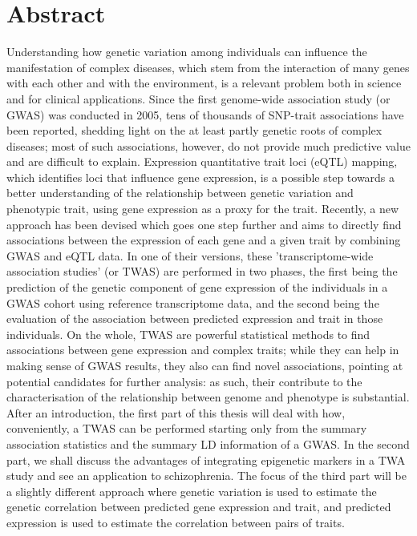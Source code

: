 \documentclass[a4paper,oneside,marginals=justified,nobib]{tufte-book}
\begin{document}

\cleardoublepage
\chapter{Abstract} %

Understanding how genetic variation among individuals can influence the 
manifestation of complex diseases, which stem from the interaction of 
many genes with each other and with the environment, is a relevant 
problem both in science and for clinical applications. Since the first 
genome-wide association study (or GWAS) was conducted in 2005, tens of 
thousands of SNP-trait associations have been reported, shedding light 
on the at least partly genetic roots of complex diseases; most of such 
associations, however, do not provide much predictive value and are 
difficult to explain. Expression quantitative trait loci (eQTL) mapping, 
which identifies loci that influence gene expression, is a possible step 
towards a better understanding of the relationship between genetic 
variation and phenotypic trait, using gene expression as a proxy for the 
trait. Recently, a new approach has been devised which goes one step 
further and aims to directly find associations between the expression of 
each gene and a given trait by combining GWAS and eQTL data. In one of 
their versions, these ’transcriptome-wide association studies’ (or TWAS) 
are performed in two phases, the first being the prediction of the 
genetic component of gene expression of the individuals in a GWAS cohort 
using reference transcriptome data, and the second being the evaluation 
of the association between predicted expression and trait in those 
individuals. On the whole, TWAS are powerful statistical methods to find 
associations between gene expression and complex traits; while they can 
help in making sense of GWAS results, they also can find novel 
associations, pointing at potential candidates for further analysis: as 
such, their contribute to the characterisation of the relationship 
between genome and phenotype is substantial. After an introduction, the 
first part of this thesis will deal with how, conveniently, a TWAS can 
be performed starting only from the summary association statistics and 
the summary LD information of a GWAS. In the second part, we shall 
discuss the advantages of integrating epigenetic markers in a TWA study 
and see an application to schizophrenia. The focus of the third part 
will be a slightly different approach where genetic variation is used to 
estimate the genetic correlation between predicted gene expression and 
trait, and predicted expression is used to estimate the correlation 
between pairs of traits. 
\end{document}
